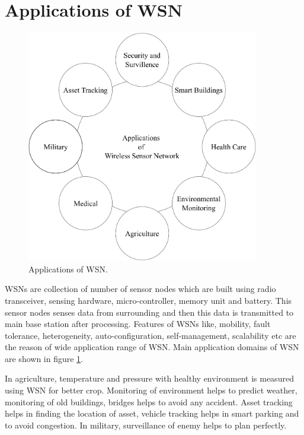 \section{Applications of WSN}
\begin{figure}[hb]
\center	
\includegraphics[width=4in, height=4in] {Figures/PDF/WSN-Applications.pdf}	
\caption{Applications of WSN.}
\label{WSN-Applications}	
\end{figure}
WSNs are collection of number of sensor nodes which are built using radio transceiver, sensing hardware, micro-controller, memory unit and battery. This sensor nodes senses data from surrounding and then this data is transmitted to main base station after processing. Features of WSNs like, mobility, fault tolerance, heterogeneity, auto-configuration, self-management, scalability etc are the reason of wide application range of WSN. Main application domains \cite{ramson2017applications} of WSN are shown in figure \ref{WSN-Applications}. 
\par In agriculture, temperature and pressure with healthy environment is measured using WSN for better crop. Monitoring of environment helps to predict weather, monitoring of old buildings, bridges helps to avoid any accident. Asset tracking helps in finding the location of asset, vehicle tracking  helps in smart parking and to avoid congestion. In military, surveillance of enemy helps to plan perfectly.